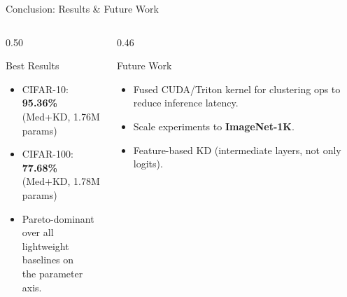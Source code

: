 \documentclass{beamer}
\begin{document}
\begin{frame}{Conclusion: Results \& Future Work}
  \begin{columns}[T]
    \begin{column}{0.50\textwidth}
      \begin{block}{Best Results}
        \begin{itemize}\setlength\itemsep{6pt}
          \item CIFAR-10: \textbf{95.36\%}\\
                (Med+KD, 1.76M params)
          \item CIFAR-100: \textbf{77.68\%}\\
                (Med+KD, 1.78M params)
          \item Pareto-dominant over all\\
                lightweight baselines on\\
                the parameter axis.
        \end{itemize}
      \end{block}
    \end{column}
    \begin{column}{0.46\textwidth}
      \begin{alertblock}{Future Work}
        \begin{itemize}\setlength\itemsep{6pt}
          \item Fused CUDA/Triton kernel
                for clustering ops to reduce
                inference latency.
          \item Scale experiments to
                \textbf{ImageNet-1K}.
          \item Feature-based KD
                (intermediate layers,
                not only logits).
        \end{itemize}
      \end{alertblock}
    \end{column}
  \end{columns}
\end{frame}
\end{document}

